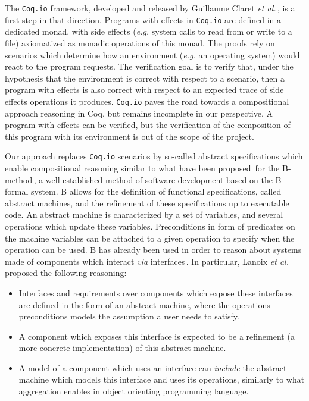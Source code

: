 %
The \texttt{Coq.io} framework, developed and released by Guillaume Claret
\emph{et al.}\,\cite{claret2015coqiowww}, is a first step in that direction.
%
Programs with effects in \texttt{Coq.io} are defined in a dedicated monad, with
side effects (\emph{e.g.}  system calls to read from or write to a file)
axiomatized as monadic operations of this monad.
%
The proofs rely on scenarios which determine how an environment (\emph{e.g.} an
operating system) would react to the program requests.
%
The verification goal is to verify that, under the hypothesis that the
environment is correct with respect to a scenario, then a program with effects
is also correct with respect to an expected trace of side effects operations it
produces.
%
\texttt{Coq.io} paves the road towards a compositional approach reasoning in
Coq, but remains incomplete in our perspective.
%
A program with effects can be verified, but the verification of the composition
of this program with its environment is out of the scope of the project.

Our approach replaces \texttt{Coq.io} scenarios by so-called abstract
specifications which enable compositional reasoning similar to what have been
proposed\,\cite{souquieres2005verifying,chouali2006proving,lanoix:hal-00105041}
for the B-method\,\cite{abrial2005b}, a well-established method of software
development based on the B formal system.
%
B allows for the definition of functional specifications, called abstract
machines, and the refinement of these specifications up to executable code.
%
An abstract machine is characterized by a set of variables, and several
operations which update these variables. Preconditions in form of predicates on
the machine variables can be attached to a given operation to specify when the
operation can be used.
%
B has already been used in order to reason about systems made of components
which interact \emph{via}
interfaces\,\cite{souquieres2005verifying,chouali2006proving,lanoix:hal-00105041}.
%
In particular, Lanoix \emph{et al.}\,\cite{lanoix:hal-00105041} proposed the
following reasoning:
%
\begin{itemize}
\item Interfaces and requirements over components which expose these interfaces
  are defined in the form of an abstract machine, where the operations
  preconditions models the assumption a user needs to satisfy.
\item A component which exposes this interface is expected to be a refinement (a
  more concrete implementation) of this abstract machine.
\item A model of a component which uses an interface can \emph{include} the
  abstract machine which models this interface and uses its operations,
  similarly to what aggregation enables in object orienting programming
  language.
\end{itemize}

